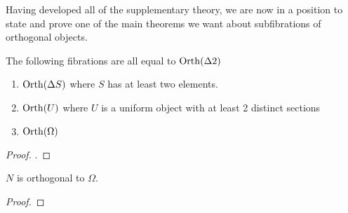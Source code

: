 Having developed all of the supplementary theory, we are now in a
position to state and prove one of the main theorems we want about
subfibrations of orthogonal objects.
\begin{thm}\label{thm:orth:allequiv}
  The following fibrations are all equal to $\operatorname{Orth}(\Delta 2)$
  \begin{enumerate}
  \item $\operatorname{Orth}(\Delta S)$ where $S$ has at least two elements.
  \item $\operatorname{Orth}(U)$ where $U$ is a uniform object with at least 2
    distinct sections
  \item $\operatorname{Orth}(\Omega)$
  \end{enumerate}
\end{thm}
\begin{proof}
  .
\end{proof}
\begin{lem}\label{lem:orth:north}
  $N$ is orthogonal to $\Omega$.
\end{lem}
\begin{proof}
\end{proof}

